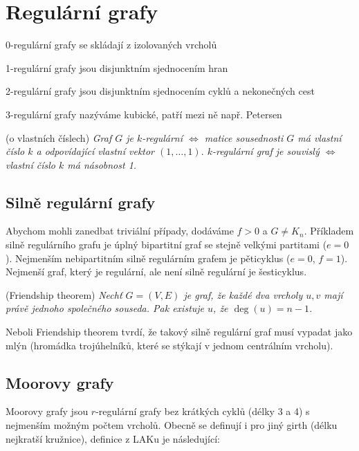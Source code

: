 \section{Regulární grafy}

\begin{itemize*}
\item 0-regulární grafy se skládají z izolovaných vrcholů
\item 1-regulární grafy jsou disjunktním sjednocením hran
\item 2-regulární grafy jsou disjunktním sjednocením cyklů a nekonečných cest
\item 3-regulární grafy nazýváme kubické, patří mezi ně např. Petersen
\end{itemize*}

\vt (o vlastních číslech) {\it Graf $G$ je $k$-regulární $\Leftrightarrow$ matice sousednosti $G$ má vlastní číslo $k$ a odpovídající vlastní vektor $(1,\dots,1).$ 
$k$-regulární graf je souvislý $\Leftrightarrow$ vlastní číslo $k$ má násobnost 1.}

\subsection{Silně regulární grafy}

Abychom mohli zanedbat triviální případy, dodáváme $f>0$ a $G\neq K_n$.
Příkladem silně regulárního grafu je úplný bipartitní graf se stejně velkými
partitami ($e=0$). Nejmenším nebipartitním silně regulárním grafem je
pěticyklus ($e=0$, $f=1$). Nejmenší graf, který je regulární, ale není silně
regulární je šesticyklus.

\vt (Friendship theorem) {\it Nechť $G=(V,E)$ je graf, že každé dva vrcholy $u,v$ mají právě jednoho společného souseda. Pak existuje $u$, že $\deg(u) = n-1$.}

Neboli Friendship theorem tvrdí, že takový silně regulární graf musí vypadat jako
mlýn (hromádka trojúhelníků, které se stýkají v jednom centrálním vrcholu).

\subsection{Moorovy grafy}
Moorovy grafy jsou $r$-regulární grafy bez krátkých cyklů (délky 3 a 4) s nejmenším možným počtem vrcholů. Obecně se definují i pro jiný girth (délku nejkratší kružnice), definice z LAKu je následující:

